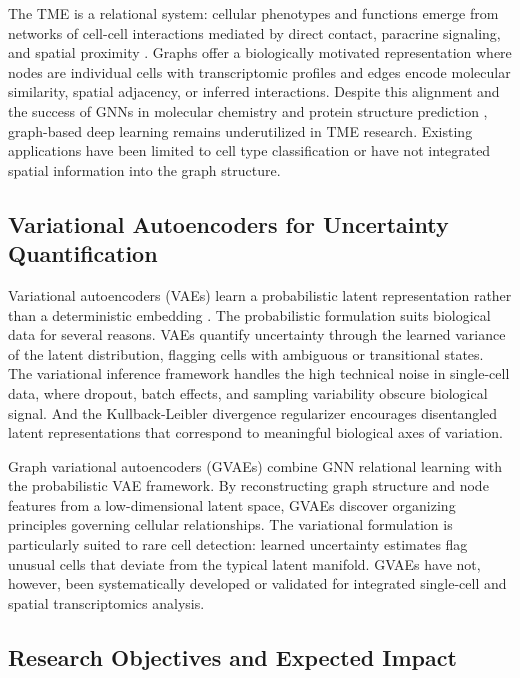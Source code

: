 \documentclass{article}
\begin{document}
The TME is a relational system: cellular phenotypes and functions emerge from networks of cell-cell interactions mediated by direct contact, paracrine signaling, and spatial proximity \citep{armingol2021deciphering}. Graphs offer a biologically motivated representation where nodes are individual cells with transcriptomic profiles and edges encode molecular similarity, spatial adjacency, or inferred interactions. Despite this alignment and the success of GNNs in molecular chemistry and protein structure prediction \citep{zitnik2018modeling}, graph-based deep learning remains underutilized in TME research. Existing applications have been limited to cell type classification \citep{shao2020sccatch} or have not integrated spatial information into the graph structure.

\subsection{Variational Autoencoders for Uncertainty Quantification}

Variational autoencoders (VAEs) learn a probabilistic latent representation rather than a deterministic embedding \citep{kingma2013auto}. The probabilistic formulation suits biological data for several reasons. VAEs quantify uncertainty through the learned variance of the latent distribution, flagging cells with ambiguous or transitional states. The variational inference framework handles the high technical noise in single-cell data, where dropout, batch effects, and sampling variability obscure biological signal. And the Kullback-Leibler divergence regularizer encourages disentangled latent representations that correspond to meaningful biological axes of variation.

Graph variational autoencoders (GVAEs) \citep{kipf2016variational} combine GNN relational learning with the probabilistic VAE framework. By reconstructing graph structure and node features from a low-dimensional latent space, GVAEs discover organizing principles governing cellular relationships. The variational formulation is particularly suited to rare cell detection: learned uncertainty estimates flag unusual cells that deviate from the typical latent manifold. GVAEs have not, however, been systematically developed or validated for integrated single-cell and spatial transcriptomics analysis.

\subsection{Research Objectives and Expected Impact}
\end{document}
